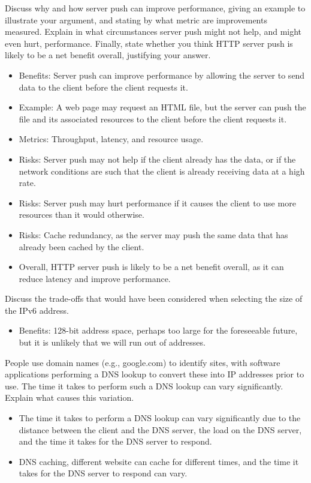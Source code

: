 \documentclass{article}
\begin{document}
Discuss why and how server push can improve performance,
giving an example to illustrate your argument, and stating by what metric are improvements
measured. Explain in what circumstances server push might not help, and might even hurt,
performance. Finally, state whether you think HTTP server push is likely to be a net benefit
overall, justifying your answer.
\begin{itemize}
    \item Benefits: Server push can improve performance by allowing the server to send data to the client before the client requests it.
    \item Example: A web page may request an HTML file, but the server can push the file and its associated resources to the client before the client requests it.
    \item Metrics: Throughput, latency, and resource usage.
    \item Risks: Server push may not help if the client already has the data, or if the network conditions are such that the client is already receiving data at a high rate.
    \item Risks: Server push may hurt performance if it causes the client to use more resources than it would otherwise.
    \item Risks: Cache redundancy, as the server may push the same data that has already been cached by the client.
    \item Overall, HTTP server push is likely to be a net benefit overall, as it can reduce latency and improve performance.
\end{itemize}

Discuss the trade-offs that would have been considered when selecting the size
of the IPv6 address.
\begin{itemize}
    \item Benefits: 128-bit address space, perhaps too large for the foreseeable future, but it is unlikely that we will run out of addresses.
\end{itemize}

People use domain names (e.g., google.com) to identify sites, with software applications
performing a DNS lookup to convert these into IP addresses prior to use. The time it takes
to perform such a DNS lookup can vary significantly. Explain what causes this variation.
\begin{itemize}
    \item The time it takes to perform a DNS lookup can vary significantly due to the distance between the client and the DNS server, the load on the DNS server, and the time it takes for the DNS server to respond.
    \item DNS caching, different website can cache for different times, and the time it takes for the DNS server to respond can vary.
\end{itemize}
\end{document}
